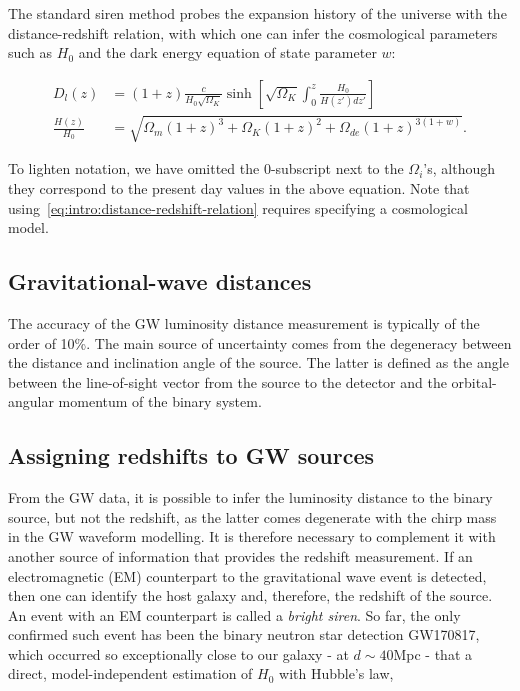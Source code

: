 \documentclass[%
 reprint,
 amsmath,amssymb,
 aps,
]{revtex4-2}
\begin{document}
The standard siren method probes the expansion history of the universe with the distance-redshift relation, with which one can infer the cosmological parameters such as $H_0$ and the dark energy equation of state parameter $w$:~\cite{Hogg:1999ad}

\begin{align}
    \label{eq:intro:distance-redshift-relation}
    D_l(z) &= (1+z)\frac{c}{H_0 \sqrt{\Omega_{K}}} \sinh \left[ \sqrt{\Omega_{K}} \int_0^z \frac{H_0}{H(z') dz'}\right]\\
    \nonumber
    \frac{H(z)}{H_0} &= \sqrt{\Omega_m (1+z)^3 + \Omega_K (1+z)^2 + \Omega_{de} (1+z)^{3(1+w)}}.
\end{align}

To lighten notation, we have omitted the 0-subscript next to the $\Omega_i$'s, although they correspond to the present day values in the above equation. Note that using~\eqref{eq:intro:distance-redshift-relation} requires specifying a cosmological model.

\subsection{Gravitational-wave distances}

The accuracy of the GW luminosity distance measurement is typically of the order of 10\%. The main source of uncertainty comes from the degeneracy between the distance and inclination angle of the source. The latter is defined as the angle between the line-of-sight vector from the source to the detector and the orbital-angular momentum of the binary system.


\subsection{Assigning redshifts to GW sources}

From the GW data, it is possible to infer the luminosity distance to the binary source, but not the redshift, as the latter comes degenerate with the chirp mass in the GW waveform modelling. It is therefore necessary to complement it with another source of information that provides the redshift measurement. If an electromagnetic (EM) counterpart to the gravitational wave event is detected, then one can identify the host galaxy and, therefore, the redshift of the source. An event with an EM counterpart is called a \textit{bright siren}. So far, the only confirmed such event has been the binary neutron star detection GW170817, which occurred so exceptionally close to our galaxy  - at $d \sim 40$Mpc - that a direct, model-independent estimation of $H_0$ with Hubble's law,
\end{document}
